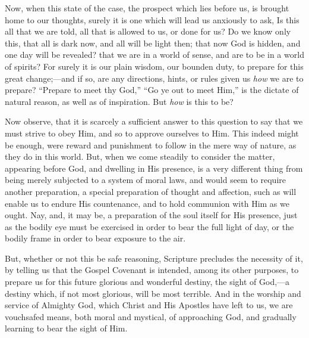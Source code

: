 Now, when this state of the case, the prospect which lies before
us, is brought home to our thoughts, surely it is one which will lead
us anxiously to ask, Is this all that we are told, all that is allowed
to us, or done for us? Do we know only this, that all is dark now, and
all will be light then; that now God is hidden, and one day will be
revealed? that we are in a world of sense, and are to be in a world of
spirits? For surely it is our plain wisdom, our bounden duty, to
prepare for this great change;—and if so, are any directions, hints,
or rules given us \emph{how} we are to prepare? ``Prepare to meet
thy God,'' ``Go ye out to meet Him,'' is the dictate of
natural reason, as well as of inspiration. But \emph{how} is this to
be?

Now observe, that it is scarcely a sufficient answer to this
question to say that we must strive to obey Him, and so to approve
ourselves to Him. This indeed might be enough, were reward and
punishment to follow in the mere way of nature, as they do in this
world. But, when we come steadily to consider the matter, appearing
before God, and dwelling in His presence, is a very different thing
from being merely subjected to a system of moral laws, and would seem
to require another preparation, a special preparation of thought and
affection, such as will enable us to endure His countenance, and to
hold communion with Him as we ought. Nay, and, it may be, a
preparation of the soul itself for His presence, just as the bodily
eye must be exercised in order to bear the full light of day, or the
bodily frame in order to bear exposure to the air.

But, whether or not this be safe reasoning, Scripture precludes the
necessity of it, by telling us that the Gospel Covenant is intended,
among its other purposes, to prepare us for this future glorious and
wonderful destiny, the sight of God,—a destiny which, if not most
glorious, will be most terrible. And in the worship and service of
Almighty God, which Christ and His Apostles have left to us, we are
vouchsafed means, both moral and mystical, of approaching God, and
gradually learning to bear the sight of Him.

